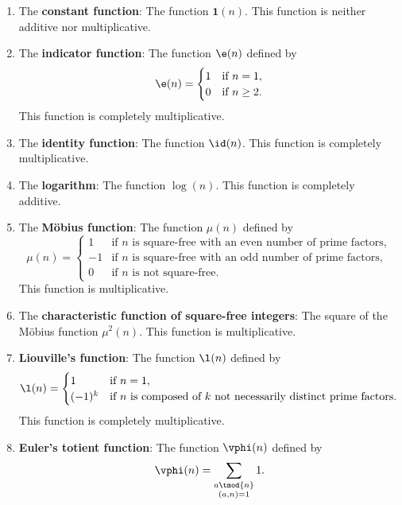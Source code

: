 \documentclass[12pt]{article}
\begin{document}
      \begin{enumerate}[label*=(\roman*)]
        \item The \textbf{constant function}: The function \(\mathbf{1}(n)\). This function is neither additive nor multiplicative.
        \item The \textbf{indicator function}: The function \(\e(n)\) defined by
        \[
          \e(n) = \begin{cases} 1 & \text{if \(n = 1\)}, \\ 0 & \text{if \(n \ge 2\)}. \end{cases}
        \]
        This function is completely multiplicative.
        \item The \textbf{identity function}: The function \(\id(n)\). This function is completely multiplicative.
        \item The \textbf{logarithm}: The function \(\log(n)\). This function is completely additive.
        \item The \textbf{M\"obius function}: The function \(\mu(n)\) defined by
        \[
          \mu(n) = \begin{cases} 1 & \text{if \(n\) is square-free with an even number of prime factors}, \\ -1 & \text{if \(n\) is square-free with an odd number of prime factors}, \\ 0 & \text{if \(n\) is not square-free}. \end{cases}
        \]
        This function is multiplicative.
        \item The \textbf{characteristic function of square-free integers}: The square of the M\"obius function \(\mu^{2}(n)\). This function is multiplicative.
        \item \textbf{Liouville's function}: The function \(\l(n)\) defined by
        \[
          \l(n) = \begin{cases} 1 & \text{if \(n = 1\)}, \\ (-1)^{k} & \text{if \(n\) is composed of \(k\) not necessarily distinct prime factors}. \end{cases}
        \]
        This function is completely multiplicative.
        \item \textbf{Euler's totient function}: The function \(\vphi(n)\) defined by
        \[
          \vphi(n) = \sum_{\substack{a \tmod{n} \\ (a,n) = 1}}1.
\]
\end{enumerate}
\end{document}
